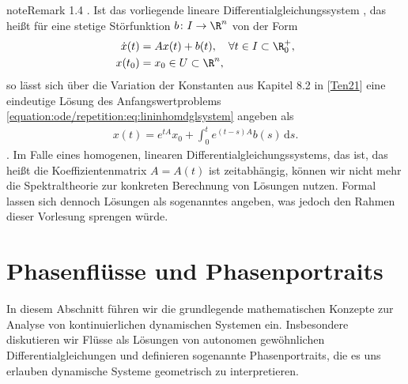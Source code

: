 \documentclass[letterpaper,10pt,german]{jupyterBook}
\begin{document}
\begin{sphinxadmonition}{note}{Remark 1.4}
. Ist das vorliegende lineare Differentialgleichungssystem , das heißt für eine stetige Störfunktion \(b \colon I \rightarrow \R^n\) von der Form
\begin{equation}\label{equation:ode/repetition:eq:lininhomdglsystem}
\begin{split}\dot{x}(t) &= A x(t) + b(t), \quad \forall t \in I \subset \R^+_0, \\
x(t_0) &= x_0 \in U \subset \R^n,\end{split}
\end{equation}
\sphinxAtStartPar
so lässt sich über die Variation der Konstanten aus Kapitel 8.2 in {[}\hyperlink{cite.references:id15}{Ten21}{]} eine eindeutige Lösung des Anfangswertproblems \eqref{equation:ode/repetition:eq:lininhomdglsystem} angeben als
\begin{equation*}
\begin{split}x(t) = e^{tA}x_0 + \int_0^t e^{(t-s)A}b(s) \, \mathrm{d}s.\end{split}
\end{equation*}
. Im Falle eines homogenen, linearen Differentialgleichungssystems, das  ist, das heißt die Koeffizientenmatrix \(A = A(t)\) ist zeitabhängig, können wir nicht mehr die Spektraltheorie zur konkreten Berechnung von Lösungen nutzen.
Formal lassen sich dennoch Lösungen als sogenanntes  angeben, was jedoch den Rahmen dieser Vorlesung sprengen würde.
\end{sphinxadmonition}


\section{Phasenflüsse und Phasenportraits}
\label{\detokenize{ode/fluesse:phasenflusse-und-phasenportraits}}\label{\detokenize{ode/fluesse:s-fluesse}}\label{\detokenize{ode/fluesse::doc}}
\sphinxAtStartPar
In diesem Abschnitt führen wir die grundlegende mathematischen Konzepte zur Analyse von kontinuierlichen dynamischen Systemen ein. Insbesondere diskutieren wir Flüsse als Lösungen von autonomen gewöhnlichen Differentialgleichungen und definieren sogenannte Phasenportraits, die es uns erlauben dynamische Systeme geometrisch zu interpretieren.
\end{document}
